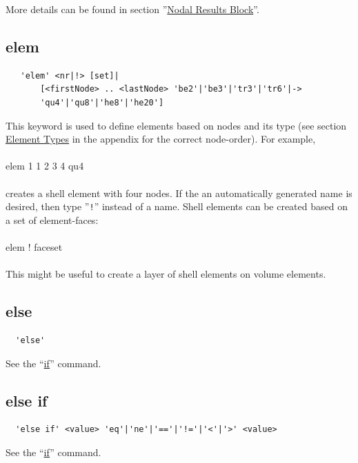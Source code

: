 \documentclass{article}
\providecommand{\htmlref}[2]{\hyperref[#2]{#1}}
\begin{document}
More details can be found in section ''\htmlref{Nodal Results Block}{Nodal Results Block}''.

\subsection{\label{elem}elem}
\begin{verbatim}
   'elem' <nr|!> [set]|
       [<firstNode> .. <lastNode> 'be2'|'be3'|'tr3'|'tr6'|->
       'qu4'|'qu8'|'he8'|'he20']
\end{verbatim}
This keyword is used to define elements based on nodes and its type (see section \htmlref{Element Types}{Element Types} in the appendix for the correct node-order). For example,\\\\
elem 1 1 2 3 4 qu4\\\\creates a shell element with four nodes. If the an automatically generated name is desired, then type ''\verb_!_'' instead of a name. Shell elements can be created based on a set of element-faces:\\\\elem ! faceset\\\\This might be useful to create a layer of shell elements on volume elements. 

\subsection{\label{else}else}
\begin{verbatim}
  'else'
\end{verbatim}
See the ``\htmlref{if}{if}'' command.

\subsection{\label{else if}else if}
\begin{verbatim}
  'else if' <value> 'eq'|'ne'|'=='|'!='|'<'|'>' <value>
\end{verbatim}
See the ``\htmlref{if}{if}'' command.
\end{document}
